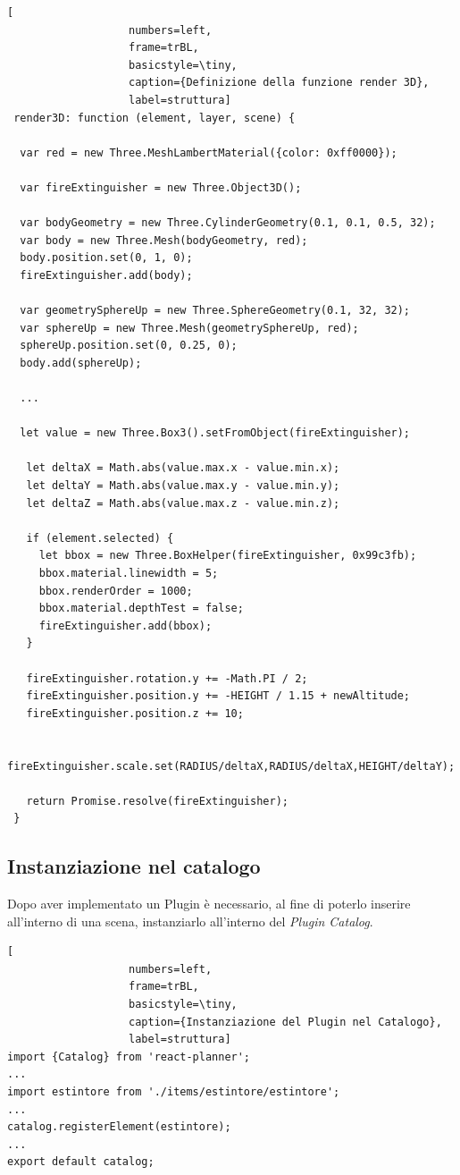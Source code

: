 \begin{lstlisting}[
                   numbers=left,
                   frame=trBL,
                   basicstyle=\tiny,
                   caption={Definizione della funzione render 3D},
                   label=struttura]
 render3D: function (element, layer, scene) {

  var red = new Three.MeshLambertMaterial({color: 0xff0000});

  var fireExtinguisher = new Three.Object3D();

  var bodyGeometry = new Three.CylinderGeometry(0.1, 0.1, 0.5, 32);
  var body = new Three.Mesh(bodyGeometry, red);
  body.position.set(0, 1, 0);
  fireExtinguisher.add(body);

  var geometrySphereUp = new Three.SphereGeometry(0.1, 32, 32);
  var sphereUp = new Three.Mesh(geometrySphereUp, red);
  sphereUp.position.set(0, 0.25, 0);
  body.add(sphereUp);

  ...

  let value = new Three.Box3().setFromObject(fireExtinguisher);

   let deltaX = Math.abs(value.max.x - value.min.x);
   let deltaY = Math.abs(value.max.y - value.min.y);
   let deltaZ = Math.abs(value.max.z - value.min.z);

   if (element.selected) {
     let bbox = new Three.BoxHelper(fireExtinguisher, 0x99c3fb);
     bbox.material.linewidth = 5;
     bbox.renderOrder = 1000;
     bbox.material.depthTest = false;
     fireExtinguisher.add(bbox);
   }

   fireExtinguisher.rotation.y += -Math.PI / 2;
   fireExtinguisher.position.y += -HEIGHT / 1.15 + newAltitude;
   fireExtinguisher.position.z += 10;

   fireExtinguisher.scale.set(RADIUS/deltaX,RADIUS/deltaX,HEIGHT/deltaY);

   return Promise.resolve(fireExtinguisher);
 }
\end{lstlisting}
\newpage

\subsection{Instanziazione nel catalogo}
Dopo aver implementato un Plugin è necessario, al fine di poterlo inserire all'interno di una scena, instanziarlo
all'interno del \emph{Plugin Catalog}.\\
\begin{lstlisting}[
                   numbers=left,
                   frame=trBL,
                   basicstyle=\tiny,
                   caption={Instanziazione del Plugin nel Catalogo},
                   label=struttura]
import {Catalog} from 'react-planner';
...
import estintore from './items/estintore/estintore';
...
catalog.registerElement(estintore);
...
export default catalog;
\end{lstlisting}

